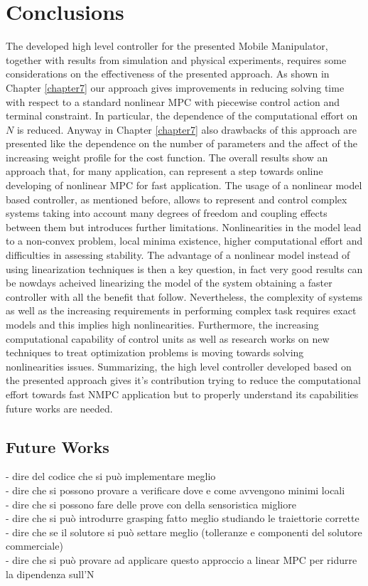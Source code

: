 
\chapter{Conclusions}
\label{conclusions}

The developed high level controller for the presented Mobile Manipulator, together with results from simulation and physical experiments, requires some considerations on the effectiveness of the presented approach. As shown in Chapter \ref{chapter7} our approach gives improvements in reducing solving time with respect to a standard nonlinear MPC with piecewise control action and terminal constraint. In particular, the dependence of the computational effort on $N$ is reduced. Anyway in Chapter \ref{chapter7} also drawbacks of this approach are presented like the dependence on the number of parameters and the affect of the increasing weight profile for the cost function. The overall results show an approach that, for many application, can represent a step towards online developing of nonlinear MPC for fast application. The usage of a nonlinear model based controller, as mentioned before, allows to represent and control complex systems taking into account many degrees of freedom and coupling effects between them but introduces further limitations. Nonlinearities in the model lead to a non-convex problem, local minima existence, higher computational effort and difficulties in assessing stability. The advantage of a nonlinear model instead of using linearization techniques is then a key question, in fact very good results can be nowdays acheived linearizing the model of the system obtaining a faster controller with all the benefit that follow. Nevertheless, the complexity of systems as well as the increasing requirements in performing complex task requires exact models and this implies high nonlinearities. Furthermore, the increasing computational capability of control units as well as research works on new techniques to treat optimization problems is moving towards solving nonlinearities issues. Summarizing, the high level controller developed based on the presented approach gives it's contribution trying to reduce the computational effort towards fast NMPC application but to properly understand its capabilities future works are needed.

\section{Future Works}

- dire del codice che si può implementare meglio \\
- dire che si possono provare a verificare dove e come avvengono minimi locali \\
- dire che si possono fare delle prove con della sensoristica migliore \\
- dire che si può introdurre grasping fatto meglio studiando le traiettorie corrette \\
- dire che se il solutore si può settare meglio (tolleranze e componenti del solutore commerciale) \\
- dire che si può provare ad applicare questo approccio a linear MPC per ridurre la dipendenza sull'N \\

